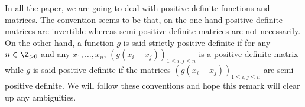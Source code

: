 \begin{rema}\label{r.pos_def}
In all the paper, we are going to deal with positive definite functions and matrices. The convention seems to be that, on the one hand positive definite matrices are invertible whereas semi-positive definite matrices are not necessarily. On the other hand, a function $g$ is said strictly positive definite if for any $n \in \Z_{>0}$ and any $x_1,\dots, x_n$, $(g(x_i-x_j))_{1 \leq i,j \leq n}$ is a positive definite matrix while $g$ is said positive definite if the matrices $(g(x_i-x_j))_{1 \leq i,j \leq n}$ are semi-positive definite. We will follow these conventions and hope this remark will clear up any ambiguities.
\end{rema}
